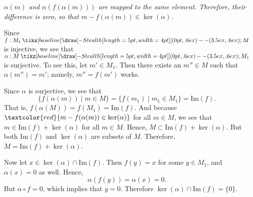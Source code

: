 \documentclass[12pt,letterpaper]{algebra_book}
\renewcommand{\to}{\mathbin{\tikz[baseline] \draw[-{Stealth[length=5pt,width=4pt]}] (0pt,.6ex) -- (3.5ex,.6ex);}}
\newcommand{\im}{\mbox{Im}}
\theoremstyle{definition}
\begin{document}
\begin{prf}
\begin{description}
\begin{center}
            \textit{$\alpha(m)$ and $\alpha(f(\alpha(m)))$ are mapped to
            the same element. Therefore, their difference is zero,
            so that $m - f(\alpha(m)) \in \ker(\alpha)$. }

        \end{center}
        Since $f: M_1 \to M$ is injective, we see that $\alpha: M
        \to M_1$ is surjective. To see this, let $m' \in M_1$.
        Then there exists an $m'' \in M$ such that $\alpha(m'') = m'$;
        namely, $m'' = f(m')$ works. 

        Since $\alpha$ is surjective, we see that 
        \[
            \{f(\alpha(m)) \mid m \in M\} = \{f(m_1) \mid m_1 \in M_1 \} = \im(f).
        \]
        That is, $f(\alpha(M)) = f(M_1) = \im(f)$.
        And because $\textcolor{red}{m - f(\alpha(m)) \in \ker(\alpha)}$ for all $m
        \in M$, we see that $m \in \im(f) + \ker(\alpha)$ for
        all $m \in M$. Hence, $M \subset \im(f) + \ker(\alpha)$.
        But both $\im(f)$ and $\ker(\alpha)$ are subsets of $M$.
        Therefore, $M = \im(f) + \ker(\alpha)$.     

        Now let $x \in \ker(\alpha) \cap \im(f)$. Then $f(y) = x$
        for some $y \in M_1$, and $\alpha(x) = 0$ as well. Hence, 
        \[
            \alpha(f(y)) = \alpha(x) = 0.
        \]
        But $\alpha \circ f = 0$, which implies that $y = 0$.
        Therefore $\ker(\alpha) \cap \im(f) = \{0\}$. 
        \begin{center}
\end{center}
\end{description}
\end{prf}
\end{document}
